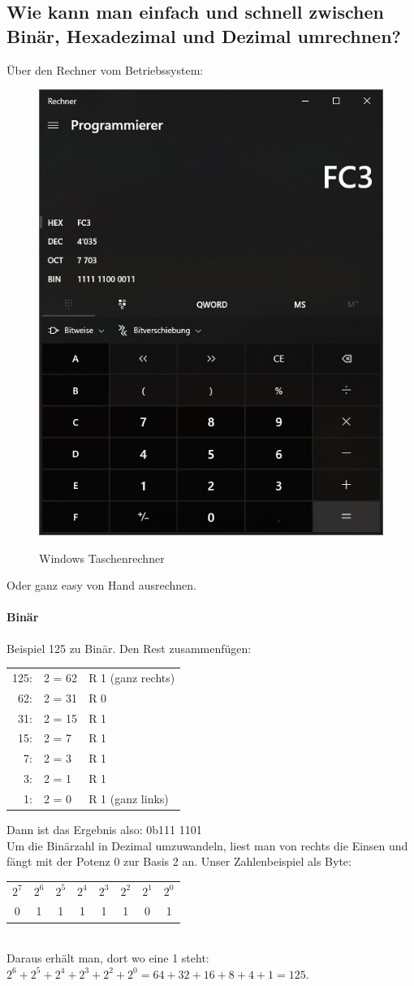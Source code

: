 \subsection*{Wie kann man einfach und schnell zwischen Binär, Hexadezimal und Dezimal umrechnen?}
    Über den Rechner vom Betriebssystem:
    \begin{figure}[H]
        \begin{center}
        \label{pic:calc}
        \includegraphics[width=.5\textwidth]{images/calc.jpg}
        \caption{Windows Taschenrechner}
        \end{center}
    \end{figure}
    Oder ganz easy von Hand ausrechnen.
    \paragraph{Binär}Beispiel 125 zu Binär. Den Rest zusammenfügen:\\
    \begin{tabular}{rll}
        125:&2 = 62&R 1 (ganz rechts)\\
        62:&2 = 31&R 0\\
        31:&2 = 15&R 1\\
        15:&2 = 7&R 1\\
        7:&2 = 3&R 1\\
        3:&2 = 1&R 1\\
        1:&2 = 0&R 1 (ganz links)\\[1em]
\end{tabular}
Dann ist das Ergebnis also: 0b111 1101\\[1em]
Um die Binärzahl in Dezimal umzuwandeln, liest man von rechts die Einsen und fängt mit der Potenz 0 zur Basis 2 an. Unser Zahlenbeispiel als Byte:\\[1em]
\begin{tabular}{cccccccc}
    $2^7$&$2^6$&$2^5$&$2^4$&$2^3$&$2^2$&$2^1$&$2^0$\\
    0&1&1&1&1&1&0&1\\
\end{tabular}\\[1em]
Daraus erhält man, dort wo eine 1 steht:\\$2^6+2^5+2^4+2^3+2^2+2^0=64+32+16+8+4+1=125$.

